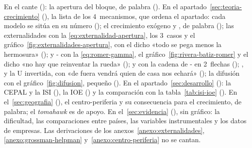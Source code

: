 \documentclass[11pt]{article}
\begin{document}
\begin{notaopositor}
En el cante (): la apertura del bloque, de palabra (). En el apartado~\ref{sec:teoria-crecimiento} (), la lista de los 4~mecanismos, que ordena el apartado: cada modelo se sitúa en su número (); el crecimiento exógeno y , de palabra (); las externalidades con la \eqref{eq:externalidad-apertura}, los 3~casos y el gráfico~\ref{fig:externalidades-apertura}, con el dicho «todo se pega menos la hermosura» ();  y - con la \eqref{eq:romer-gamma}, el gráfico~\ref{fig:rivera-batiz-romer} y el dicho «no hay que reinventar la rueda» ();  y  con la cadena de - en 2~flechas (); ,  y la U invertida, con «de fuera vendrá quien de casa nos echará» (); la difusión con el gráfico~\ref{fig:difusion}, pequeño (). En el apartado~\ref{sec:desarrollo} (): la CEPAL y la ISI (), la IOE () y la comparación con la tabla~\ref{tab:isi-ioe} (). En el~\ref{sec:geografia} (), el centro-periferia y su consecuencia para el crecimiento, de palabra; el \emph{tomahawk} es de apoyo. En el~\ref{sec:evidencia} (), sin gráfico: la dificultad, las comparaciones entre países, las variables instrumentales y los datos de empresas. Las derivaciones de los anexos~\ref{anexo:externalidades}, \ref{anexo:grossman-helpman} y~\ref{anexo:centro-periferia} no se cantan.
\end{notaopositor}
\end{document}
